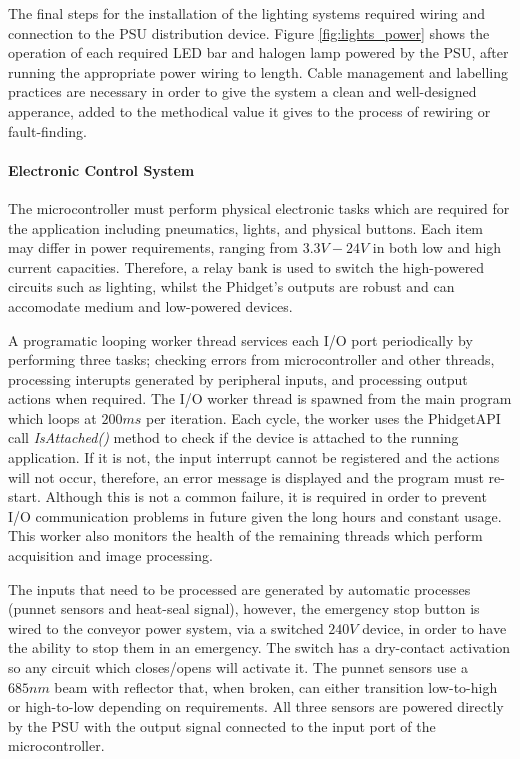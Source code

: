 \documentclass[fleqn,twoside]{article}
\begin{document}
The final steps for the installation of the lighting systems required wiring and connection to the PSU distribution device. Figure \ref{fig:lights_power} shows the operation of each required LED bar and halogen lamp powered by the PSU, after running the appropriate power wiring to length. Cable management and labelling practices are necessary in order to give the system a clean and well-designed apperance, added to the methodical value it gives to the process of rewiring or fault-finding.



\paragraph{Electronic Control System}


The microcontroller must perform physical electronic tasks which are required for the application including pneumatics, lights, and physical buttons. Each item may differ in power requirements, ranging from $3.3V-24V$ in both low and high current capacities. Therefore, a relay bank is used to switch the high-powered circuits such as lighting, whilst the Phidget\texttrademark's outputs are robust and can accomodate medium and low-powered devices. 


A programatic looping worker thread services each I/O port periodically by performing three tasks; checking errors from microcontroller and other threads, processing interupts generated by peripheral inputs, and processing output actions when required. The I/O worker thread is spawned from the main program which loops at $200ms$ per iteration. Each cycle, the worker uses the Phidget\texttrademark API call \textit{IsAttached()} method to check if the device is attached to the running application. If it is not, the input interrupt cannot be registered and the actions will not occur, therefore, an error message is displayed and the program must re-start. Although this is not a common failure, it is required in order to prevent I/O communication problems in future given the long hours and constant usage. This worker also monitors the health of the remaining threads which perform acquisition and image processing. 

The inputs that need to be processed are generated by automatic processes (punnet sensors and heat-seal signal), however, the emergency stop button is wired to the conveyor power system, via a switched $240V$ device, in order to have the ability to stop them in an emergency. The switch has a dry-contact activation so any circuit which closes/opens will activate it. The punnet sensors use a $685nm$ beam with reflector that, when broken, can either transition low-to-high or high-to-low depending on requirements. All three sensors are powered directly by the PSU with the output signal connected to the input port of the microcontroller. 
\end{document}
